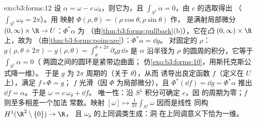 \begin{solution}{exo:b3:forms:12}
设 $\alpha = \omega - c\,\omega_\theta$，则它为，且
$\int_{S^1}\alpha = 0$，由 $c$ 的选取得出
（$\int_{S^1}\omega_\theta = 2\pi$）。用
映射 $\Phi(\rho, \theta) = (\rho\cos\theta, \rho\sin\theta)$ 作，
是满射局部微分 $(0, \infty)\times\R \to
U$：$\Phi^*\alpha$ 为
（由\cref{thm:b3:forms:pullback}(b)），它在\emph{凸}
$(0,\infty)\times\R$ 上，故为
（由\cref{thm:b3:forms:poincare}）：$\Phi^*\alpha = \dd g$。
对固定的 $\rho$：$g(\rho, \theta + 2\pi) - g(\rho, \theta)
= \int_\theta^{\theta + 2\pi}\partial_\theta g\,\dd s$ 是
$\alpha$ 沿半径为
$\rho$ 的圆周的积分，它等于 $\int_{S^1}\alpha = 0$（
两圆之间的圆环是紧带边曲面；
仿\cref{exo:b3:forms:10}，用斯托克斯公式降一维）。
于是 $g$ 为 $2\pi$ 周期的（关于 $\theta$），从而
诱导出良定函数 $f$（定义在 $U$ 上），满足 $f\circ\Phi = g$；
$f$ 光滑（因 $\Phi$ 为局部微分），且
$\Phi^*(\dd f) = \dd g = \Phi^*\alpha$ 推出 $\dd f =
\alpha$。于是 $\omega = c\,\omega_\theta + \dd f$。
唯一性：沿 $S^1$ 积分可确定 $c$，因
的周期为零；$f$ 则至多相差一个加法
常数。映射 $[\omega] \mapsto
\frac1{2\pi}\int_{S^1}\omega$ 因而是线性
同构 $H^1(\R^2\setminus\{0\}) \to \R$，
且 $\omega_\theta$ 的上同调类生成：洞
在上同调意义下恰为一维。
\end{solution}

